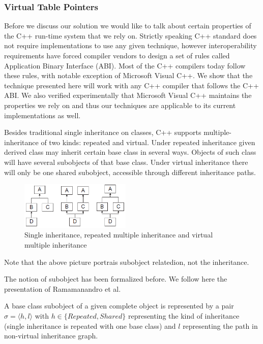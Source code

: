 \documentclass[preprint]{sigplanconf}
\begin{document}
\subsubsection{Virtual Table Pointers}
\label{sec:vtp}

Before we discuss our solution we would like to talk about certain properties of 
the C++ run-time system that we rely on. Strictly speaking C++ standard does not 
require implementations to use any given technique, however interoperability 
requirements have forced compiler vendors to design a set of rules called 
Application Binary Interface (ABI)\cite{C++ABI}. Most of the C++ compilers today 
follow these rules, with notable exception of Microsoft Visual C++. We show that 
the technique presented here will work with any C++ compiler that follows the 
C++ ABI. We also verified experimentally that Microsoft Visual C++ maintains the 
properties we rely on and thus our techniques are applicable to its current 
implementations as well.

Besides traditional single inheritance on classes, C++ supports 
multiple-inheritance of two kinds: repeated and virtual. Under repeated 
inheritance given derived class may inherit certain base class in several ways. 
Objects of such class will have several subobjects of that base class. Under 
virtual inheritance there will only be one shared subobject, accessible through 
different inheritance paths.

\begin{figure}[tbp]
  \centering
    \includegraphics[width=0.47\textwidth]{Hierarchies.png}
  \caption{Single inheritance, repeated multiple inheritance and virtual multiple inheritance}
  \label{fig:hierarchy}
\end{figure}

\noindent
Note that the above picture portrais subobject relatedion, not the inheritance.

The notion of subobject has been formalized before\cite{RF95,WNST06,RDL11}.
We follow here the presentation of Ramamanandro et al\cite{RDL11}.

A base class subobject of a given complete object is represented by a pair 
$\sigma = \langle h,l\rangle$ with $h \in \{Repeated,Shared\}$ representing the 
kind of inheritance (single inheritance is repeated with one base class) and $l$ 
representing the path in non-virtual inheritance graph.
\end{document}
